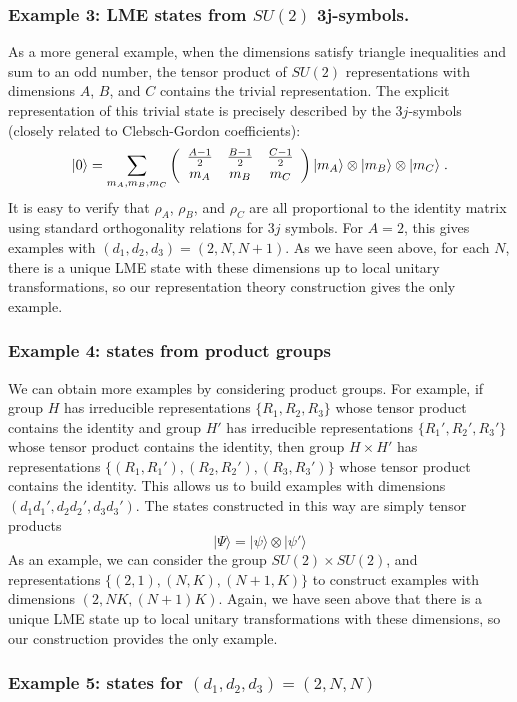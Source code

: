 \documentclass[12pt]{article}
\theoremstyle{definition}
\newcommand{\be}{\begin{equation}}
\newcommand{\ee}{\end{equation}}
\newcommand{\ba}{\begin{array}}
\newcommand{\ea}{\end{array}}
\begin{document}
\subsubsection*{Example 3: LME states from $SU(2)$ 3j-symbols.}

As a more general example, when the dimensions satisfy triangle inequalities and sum to an odd number, the tensor product of $SU(2)$ representations with dimensions $A$, $B$, and $C$ contains the trivial representation. The explicit representation of this trivial state is precisely described by the $3j$-symbols (closely related to Clebsch-Gordon coefficients):
\be
|0 \rangle =  \sum_{m_A,m_B,m_C} \left( \ba{ccc} {A - 1 \over 2} & {B - 1 \over 2} &{C - 1 \over 2} \cr m_A & m_B & m_C \ea \right) |m_A \rangle \otimes |m_B \rangle \otimes |m_C \rangle \; .
\ee
It is easy to verify that $\rho_A$, $\rho_B$, and $\rho_C$ are all proportional to the identity matrix using standard orthogonality relations for $3j$ symbols. For $A=2$, this gives examples with $(d_1,d_2,d_3) = (2,N,N+1)$. As we have seen above, for each $N$, there is a unique LME state with these dimensions up to local unitary transformations, so our representation theory construction gives the only example.

\subsubsection*{Example 4: states from product groups}

We can obtain more examples by considering product groups. For example, if group $H$ has irreducible representations $\{R_1,R_2,R_3\}$ whose tensor product contains the identity and group $H'$ has irreducible representations $\{R_1',R_2',R_3'\}$ whose tensor product contains the identity, then group $H \times H'$ has representations $\{(R_1,R_1'),(R_2,R_2'),(R_3,R_3')\}$ whose tensor product contains the identity. This allows us to build examples with dimensions $(d_1 d_1',d_2 d_2', d_3 d_3')$. The states constructed in this way are simply tensor products
\be
|\Psi \rangle = |\psi \rangle \otimes |\psi' \rangle
\ee
As an example, we can consider the group $SU(2) \times SU(2)$, and representations $\{(2,1),(N,K),(N+1,K)\}$ to construct examples with dimensions $(2,NK,(N+1)K)$. Again, we have seen above that there is a unique LME state up to local unitary transformations with these dimensions, so our construction provides the only example.

\subsubsection*{Example 5: states for $(d_1,d_2,d_3) = (2,N,N)$}
\end{document}

